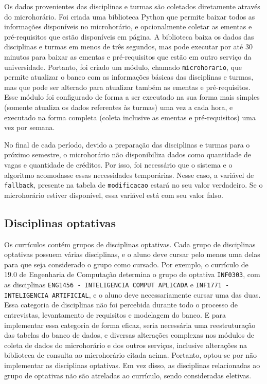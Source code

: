 

Os dados provenientes das disciplinas e turmas são coletados diretamente através do microhorário. Foi criada uma biblioteca Python que permite baixar todos as informações disponíveis no microhorário, e opcionalmente coletar as ementas e pré-requisitos que estão disponíveis em página. A biblioteca baixa os dados das disciplinas e turmas em menos de três segundos, mas pode executar por até 30 minutos para baixar as ementas e pré-requisitos que estão em outro serviço da universidade. Portanto, foi criado um módulo, chamado \verb|microhorario|, que permite atualizar o banco com as informações básicas das disciplinas e turmas, mas que pode ser alterado para atualizar também as ementas e pré-requisitos. Esse módulo foi configurado de forma a ser executado na sua forma mais simples (somente atualiza os dados referentes às turmas) uma vez a cada hora, e executado na forma completa (coleta inclusive as ementas e pré-requisitos) uma vez por semana.

No final de cada período, devido a preparação das disciplinas e turmas para o próximo semestre, o microhorário não disponibiliza dados como quantidade de vagas e quantidade de créditos. Por isso, foi necessário que o sistema e o algoritmo acomodasse essas necessidades temporárias. Nesse caso, a variável de \verb|fallback|, presente na tabela de \verb|modificacao| estará no seu valor verdadeiro. Se o microhorário estiver disponível, essa variável está com seu valor falso.

\subsection{Disciplinas optativas}
Os currículos contém grupos de disciplinas optativas. Cada grupo de disciplinas optativas possuem várias disciplinas, e o aluno deve cursar pelo menos uma delas para que seja considerado o grupo como cursado. Por exemplo, o currículo de 19.0 de Engenharia de Computação determina o grupo de optativa \verb|INF0303|, com as disciplinas \verb|ENG1456 - INTELIGENCIA COMPUT APLICADA| e \verb|INF1771 - INTELIGENCIA ARTIFICIAL|, e o aluno deve necessariamente cursar uma das duas. Essa categoria de disciplinas não foi percebida durante todo o processo de entrevistas, levantamento de requisitos e modelagem do banco. E para implementar essa categoria de forma eficaz, seria necessária uma reestruturação das tabelas do banco de dados, e diversas alterações complexas nos módulos de coleta de dados do microhorário e dos outros serviços, inclusive alterações na biblioteca de consulta ao microhorário citada acima. Portanto, optou-se por não implementar as disciplinas optativas. Em vez disso, as disciplinas relacionadas ao grupo de optativas não são atreladas ao currículo, sendo consideradas eletivas.


